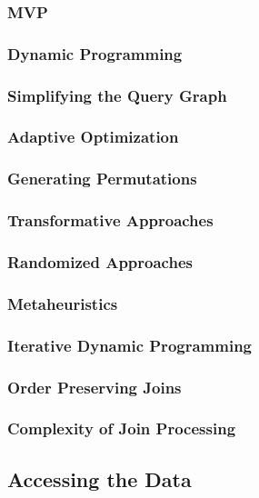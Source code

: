 \documentclass[11pt]{article}
\begin{document}
\subsubsection{MVP}
\label{sec:org3f02680}
\subsubsection{Dynamic Programming}
\label{sec:org738dd53}
\subsubsection{Simplifying the Query Graph}
\label{sec:org602b537}
\subsubsection{Adaptive Optimization}
\label{sec:org87c915b}
\subsubsection{Generating Permutations}
\label{sec:org6f30d78}
\subsubsection{Transformative Approaches}
\label{sec:orgfcc4a3b}
\subsubsection{Randomized Approaches}
\label{sec:org3a1d8e9}
\subsubsection{Metaheuristics}
\label{sec:org9d3aaca}
\subsubsection{Iterative Dynamic Programming}
\label{sec:org73e858e}
\subsubsection{Order Preserving Joins}
\label{sec:orgd4715cd}
\subsubsection{Complexity of Join Processing}
\label{sec:org66b2828}
\subsection{Accessing the Data}
\label{sec:org115e3a3}
\end{document}
